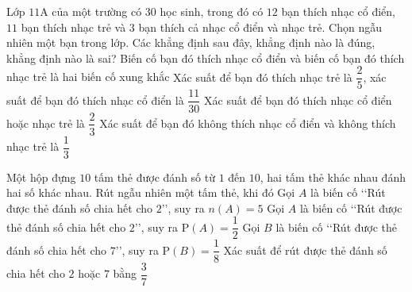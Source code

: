 \begin{ex}%
 Lớp $11$A của một trường có $30$ học sinh, trong đó có $12$ bạn thích nhạc cổ điển, $11$ bạn thích nhạc trẻ và $3$ bạn thích cả nhạc cổ điển và nhạc trẻ. Chọn ngẫu nhiên một bạn trong  lớp. Các khẳng định sau đây, khẳng định nào là đúng, khẳng định nào là sai?
 \choiceTF 
  {Biến cố bạn đó thích nhạc cổ điển và biến cố bạn đó thích nhạc trẻ là hai biến  cố xung khắc}
   {Xác suất để bạn đó thích nhạc trẻ là $\dfrac{2}{5}$, xác suất để bạn đó thích nhạc cổ điển là $\dfrac{11}{30}$}
  {\True Xác suất để bạn đó thích nhạc cổ điển hoặc nhạc  trẻ là $\dfrac{2}{3}$}
  {\True Xác suất để bạn đó không thích nhạc cổ điển và không thích  nhạc trẻ là $\dfrac{1}{3}$}
\end{ex}

\begin{ex}%
 Một hộp đựng $10$ tấm thẻ được đánh số từ $1$ đến $10$, hai tấm thẻ khác nhau đánh hai số  khác nhau. Rút ngẫu nhiên một tấm thẻ, khi đó
 \choiceTF 
   {\True Gọi $A$ là biến cố \lq\lq Rút được thẻ đánh số chia hết cho $2$\rq\rq, suy ra $n(A)=5$}
  {\True Gọi $A$ là biến cố \lq\lq Rút được thẻ đánh số chia hết cho $2$\rq\rq,  suy ra $\mathrm{P}(A)=\dfrac{1}{2}$}
  {Gọi $B$ là biến cố  \lq\lq Rút được thẻ đánh số chia hết cho $7$\rq\rq, suy ra $\mathrm{P}(B)=\dfrac{1}{8}$}
   {Xác suất để rút được thẻ đánh số chia hết cho $2$ hoặc $7$ bằng $\dfrac{3}{7}$}
\end{ex}

